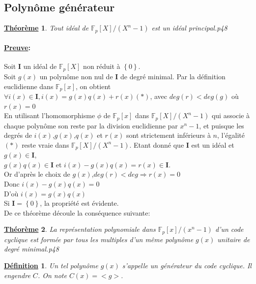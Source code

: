 \documentclass[12pt,openany]{report}
\newtheorem{theorem}{\underline{Théorème}}
\newtheorem{definition}{\underline{Définition}}
\begin{document}
\subsection{Polynôme générateur}
\begin{theorem}
Tout idéal de $\mathbb{F}_p[X]/(X^n-1)$ est un idéal principal.\cite{M.Ibrahima_Mbaye}p48
\end{theorem}


\paragraph{\underline{Preuve}:\\}
Soit $\mathbf{I} $ un idéal de $\mathbb{F}_p[X] $ non réduit à $\left\lbrace 0 \right\rbrace  $.\\
Soit $g(x)$ un polynôme non nul de $\mathbf{I} $ de degré minimal. Par la définition euclidienne dans $\mathbb{F}_{p}[x]$, on obtient $\forall i(x) \in \mathbf{I}, i(x)=g(x)q(x)+r(x)(*)$, avec $deg(r) < deg(g)$ où $r(x)=0$\\
En utilisant l'homomorphisme $\phi$ de $\mathbb{F}_{p}[x]$ dans $\mathbb{F}_p[X]/(X^n-1)$ qui associe à chaque polynôme son reste par la division euclidienne par $x^n-1$, et puisque les degrés de $i(x)$,$g(x)$,$q(x)$ et $r(x)$ sont strictement
inférieurs à $n$, l'égalité $(*) $ reste vraie dans $ \mathbb{F}_p[X]/(X^n-1)$. Etant donné que $\mathbf{I}$ est un idéal et $ g(x) \in \mathbf{I}$,\\
$g(x)q(x) \in \mathbf{I}$ et $i(x)-g(x)q(x)=r(x)\in \mathbf{I}.   $\\
Or d'après le choix de $g(x)$,$deg(r)<deg\Rightarrow r(x)=0   $\\
Donc $i(x)-g(x)q(x)=0$\\
D'où $i(x)=g(x)q(x)$\\
Si $\mathbf{I}=\left\lbrace 0  \right\rbrace $, la propriété est évidente.\\
De ce théorème découle la conséquence suivante:

\begin{theorem}
La représentation polynomiale dans $\mathbb{F}_{p}[x]/(x^n-1)  $ d'un code cyclique est formée par tous les multiples d'un même polynôme $ g(x)$ unitaire de degré minimal.\cite{M.Ibrahima_Mbaye}p48
\end{theorem}
\begin{definition}
Un tel polynôme $g(x)$ s'appelle un générateur du code cyclique. Il engendre $\mathit{C}$. On note $\mathit{C}(x)=<g>$.
\end{definition}
\end{document}
